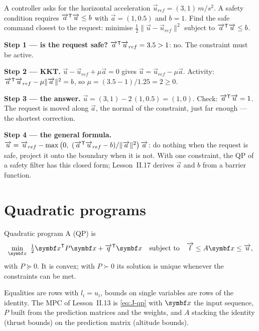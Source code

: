 \begin{example}
\label{ex:J-filter}
A controller asks for the horizontal acceleration $\vec u_{ref} = (3, 1)\,\si{m/s^2}$. A safety condition requires $\overrightarrow{a}^{\mathsf{T}}\overrightarrow{u} \le b$ with $\vec a = (1, 0.5)$ and $b = 1$. Find the safe command closest to the request: minimise $\tfrac12\|\vec u - \vec u_{ref}\|^2$ subject to $\overrightarrow{a}^{\mathsf{T}}\overrightarrow{u} \le b$.

\textbf{Step 1 — is the request safe?} $\overrightarrow{a}^{\mathsf{T}}\overrightarrow{u}_{ref} = 3.5 > 1$: no. The constraint must be active.

\textbf{Step 2 — KKT.} $\vec u - \vec u_{ref} + \mu\vec a = 0$ gives $\vec u = \vec u_{ref} - \mu\vec a$. Activity: $\overrightarrow{a}^{\mathsf{T}}\overrightarrow{u}_{ref} - \mu\|\overrightarrow{a}\|^2 = b$, so $\mu = (3.5 - 1)/1.25 = 2 \ge 0$.

\textbf{Step 3 — the answer.} $\vec u = (3, 1) - 2\,(1, 0.5) = (1, 0)$. Check: $\overrightarrow{a}^{\mathsf{T}}\overrightarrow{u} = 1$. The request is moved along $\vec a$, the normal of the constraint, just far enough — the shortest correction.

\textbf{Step 4 — the general formula.} $\overrightarrow{u} = \overrightarrow{u}_{ref} - \max\big(0,\ (\overrightarrow{a}^{\mathsf{T}}\overrightarrow{u}_{ref} - b)/\|\overrightarrow{a}\|^2\big)\,\overrightarrow{a}$: do nothing when the request is safe, project it onto the boundary when it is not. With one constraint, the QP of a safety filter has this closed form; Lesson~II.17 derives $\vec a$ and $b$ from a barrier function.
\end{example}

\section{Quadratic programs}

\begin{definition}{Quadratic program}
A  (QP) is
\begin{equation}\label{eq:J-qp}
  \min_{\vx}\ \tfrac12\vx^\T P\vx + \vec q^\T\vx \quad\text{subject to}\quad \vec l \le A\vx \le \vec u ,
\end{equation}
with $P \succeq 0$. It is convex; with $P \succ 0$ its solution is unique whenever the constraints can be met.
\end{definition}

Equalities are rows with $l_i = u_i$, bounds on single variables are rows of the identity. The MPC of Lesson~II.13 is \cref{eq:J-qp} with $\vx$ the input sequence, $P$ built from the prediction matrices and the weights, and $A$ stacking the identity (thrust bounds) on the prediction matrix (altitude bounds).

